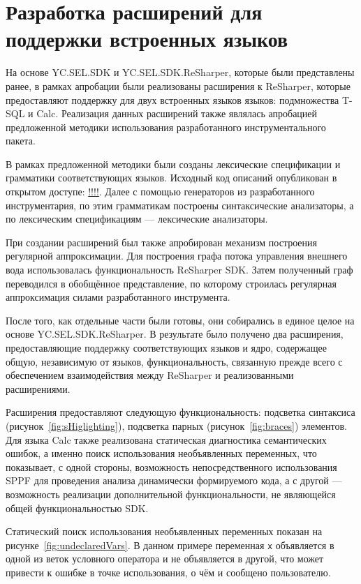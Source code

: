 \section{Разработка расширений для поддержки встроенных языков}

На основе YC.SEL.SDK и YC.SEL.SDK.ReSharper, которые были представлены ранее, в рамках апробации были реализованы расширения к ReSharper, которые предоставляют поддержку для  двух встроенных языков языков: подмножества T-SQL и Calc. Реализация данных расширений также являлась апробацией предложенной методики использования разработанного инструментального пакета.

В рамках предложенной методики были созданы лексические спецификации и грамматики соответствующих языков. Исходный код описаний опубликован в открытом доступе: \url{!!!!}. Далее с помощью генераторов из разработанного инструментария, по этим грамматикам построены синтаксические анализаторы, а по лексическим спецификациям --- лексические анализаторы.

При создании расширений был также апробирован механизм построения регулярной аппроксимации. Для построения графа потока управления внешнего вода использовалась функциональность ReSharper SDK. Затем полученный граф переводился в обобщённое представление, по которому строилась регулярная аппроксимация силами разработанного инструмента.

После того, как отдельные части были готовы, они собирались в единое целое на основе YC.SEL.SDK.ReSharper. В результате было получено два расширения, предоставляющие поддержку соответствующих языков и ядро, содержащее общую, независимую от языков, функциональность, связанную прежде всего с обеспечением взаимодействия между ReSharper и реализованными расширениями.

Расширения предоставляют следующую функциональность: подсветка синтаксиса (рисунок~\ref{fig:sHiglighting}), подсветка парных (рисунок~\ref{fig:braces}) элементов. Для языка Calc также реализована статическая диагностика семантических ошибок, а именно поиск использования необъявленных переменных, что показывает, с одной стороны, возможность непосредственного использования SPPF для проведения анализа динамически формируемого кода, а с другой --- возможность реализации дополнительной функциональности, не являющейся общей функциональностью SDK.

Статический поиск использования необъявленных переменных показан на 
рисунке~\ref{fig:undeclaredVars}. В данном примере переменная \verb|x| объявляется в одной из веток условного оператора и не объявляется в другой, что может привести к ошибке в точке использования, о чём и сообщено пользователю.

